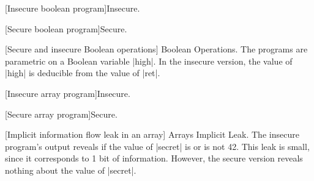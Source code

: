 \begin{center}
\begin{minipage}{\textwidth}
\begin{minipage}{.45\textwidth}
[Insecure boolean program]{Insecure.}
\label{ni-bool-insecure}
\end{minipage}\hfill
\begin{minipage}[]{.45\textwidth}
[Secure boolean program]{Secure.}
\label{ni-bool-secure}
\end{minipage}
[Secure and insecure Boolean operations]{
{Boolean Operations.} The programs are parametric on a Boolean variable \pr|high|.
In the insecure version, the value of \pr|high| is deducible from the value of \pr|ret|.
}\label{fig:bool-ops}
\end{minipage}
\end{center}

\begin{center}
\begin{minipage}{\textwidth}
\begin{minipage}{.45\textwidth}
[Insecure array program]{Insecure.}
\label{ni-array-insecure}
\end{minipage}\hfill%
\begin{minipage}{.45\textwidth}
[Secure array program]{Secure.}
\label{ni-array-secure}
\end{minipage}
[Implicit information flow leak in an array]{
{Arrays Implicit Leak.}
The insecure program's output reveals if the value of \pr|secret| is or is not 42.
This leak is small, since it corresponds to 1 bit of information.
However, the secure version reveals nothing about the value of \pr|secret|.}
\label{fig:ni-arrays}
\end{minipage}
\end{center}

